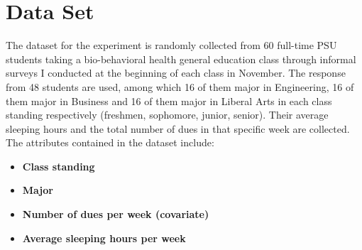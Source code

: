 \documentclass{article} %
\begin{document}
\section{Data Set}
The dataset for the experiment is randomly collected from 60 full-time PSU students taking a bio-behavioral health general education class through informal surveys I conducted at the beginning of each class in November. The response from 48 students are used, among which 16 of them major in Engineering, 16 of them major in Business and 16 of them major in Liberal Arts in each class standing respectively (freshmen, sophomore, junior, senior). Their average sleeping hours and the total number of dues in that specific week are collected.
The attributes contained in the dataset include:
\begin{itemize}
\item  \textbf{Class standing}
\item  \textbf{Major}
\item  \textbf{Number of dues per week (covariate)}
\item  \textbf{Average sleeping hours per week}
\end{itemize}
\end{document}
